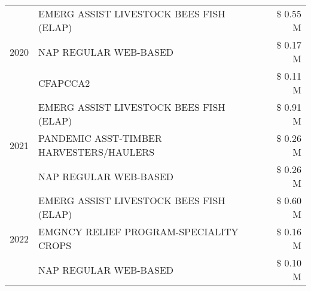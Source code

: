 \begin{tabular}{llr}
\cline{1-3}
\multirow[t]{3}{*}{2020} & EMERG ASSIST LIVESTOCK BEES FISH (ELAP) & \$ 0.55 M \\
 & NAP REGULAR WEB-BASED & \$ 0.17 M \\
 & CFAPCCA2 & \$ 0.11 M \\
\cline{1-3}
\multirow[t]{3}{*}{2021} & EMERG ASSIST LIVESTOCK BEES FISH (ELAP) & \$ 0.91 M \\
 & PANDEMIC ASST-TIMBER HARVESTERS/HAULERS & \$ 0.26 M \\
 & NAP REGULAR WEB-BASED & \$ 0.26 M \\
\cline{1-3}
\multirow[t]{3}{*}{2022} & EMERG ASSIST LIVESTOCK BEES FISH (ELAP) & \$ 0.60 M \\
 & EMGNCY RELIEF PROGRAM-SPECIALITY CROPS & \$ 0.16 M \\
 & NAP REGULAR WEB-BASED & \$ 0.10 M \\
\cline{1-3}
\bottomrule
\end{tabular}
